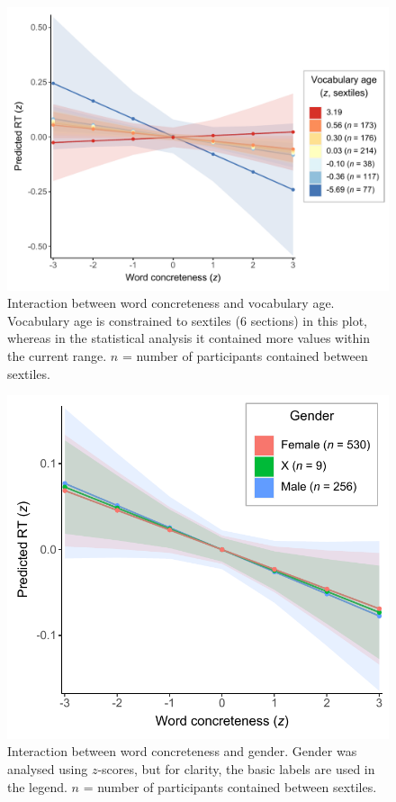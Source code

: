 \documentclass[
  12pt,
  man,floatsintext]{apa7}
\begin{document}
\begin{figure}

{\centering \includegraphics[width=0.9\linewidth]{../lexicaldecision/frequentist_analysis/plots/lexicaldecision-interaction-word-concreteness-vocabulary-age} 

}

\caption{Interaction between word concreteness and vocabulary age. Vocabulary age is constrained to sextiles (6 sections) in this plot, whereas in the statistical analysis it contained more values within the current range. \(n\) = number of participants contained between sextiles.}\label{fig:lexicaldecision-interaction-word-concreteness-vocabulary-age}
\end{figure}



\begin{figure}

{\centering \includegraphics[width=0.65\linewidth]{../lexicaldecision/frequentist_analysis/plots/lexicaldecision-interaction-word-concreteness-gender} 

}

\caption{Interaction between word concreteness and gender. Gender was analysed using \(z\)-scores, but for clarity, the basic labels are used in the legend. \(n\) = number of participants contained between sextiles.}\label{fig:lexicaldecision-interaction-word-concreteness-gender}
\end{figure}
\end{document}
